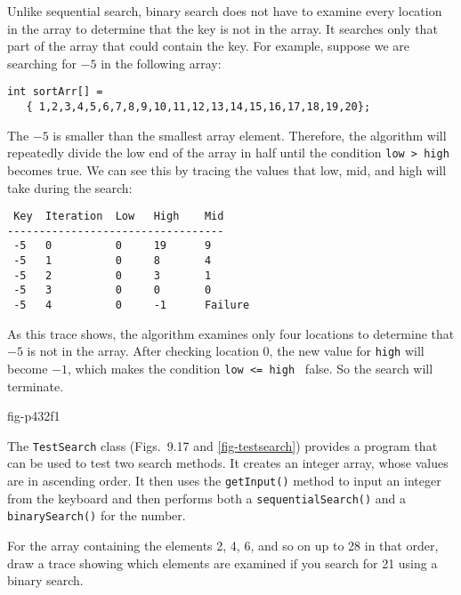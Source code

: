 Unlike sequential search, binary search does not have to examine every
location in the array to determine that the key is not in the array.
It searches only that part of the array that could contain the key.
For example, suppose we are searching for $-5$ in the following array:

\begin{jjjlisting}
\begin{lstlisting}
int sortArr[] = 
   { 1,2,3,4,5,6,7,8,9,10,11,12,13,14,15,16,17,18,19,20};
\end{lstlisting}
\end{jjjlisting}

\noindent The $-5$ is
smaller than the smallest array element. Therefore, the algorithm will
repeatedly divide the low end of the array in half until the condition
\verb|low > high| becomes true.  We can see this by tracing the values
that low, mid, and high will take during the search:

\begin{jjjlisting}
\begin{lstlisting}
 Key  Iteration  Low   High    Mid
----------------------------------
 -5   0          0     19      9
 -5   1          0     8       4
 -5   2          0     3       1
 -5   3          0     0       0
 -5   4          0     -1      Failure
\end{lstlisting}
\end{jjjlisting}

\noindent As this trace shows, the algorithm examines only
four locations to determine that $-5$ is not in the array.
After checking location 0, the new value for {\tt high} will become
$-1$, which makes the condition \verb|low <= high | false.  So the
search will terminate.

{fig-p432f1}


The {\tt TestSearch} class (Figs.~9.17 and \ref{fig-testsearch})
provides a  program that can be used to test two search methods.
It creates an integer array, whose values are in ascending order.  It
then uses the {\tt getInput()} method to input an integer from the
keyboard and then performs both a {\tt sequentialSearch()} and a {\tt
binarySearch()} for the number.


\label{self-study-exercise}
\begin{SSTUDY}

\item  For the array containing the elements 2, 4, 6, and so on up to 28 in
that order, draw a trace showing which elements are examined if you
search for 21 using a binary search.

\end{SSTUDY}

